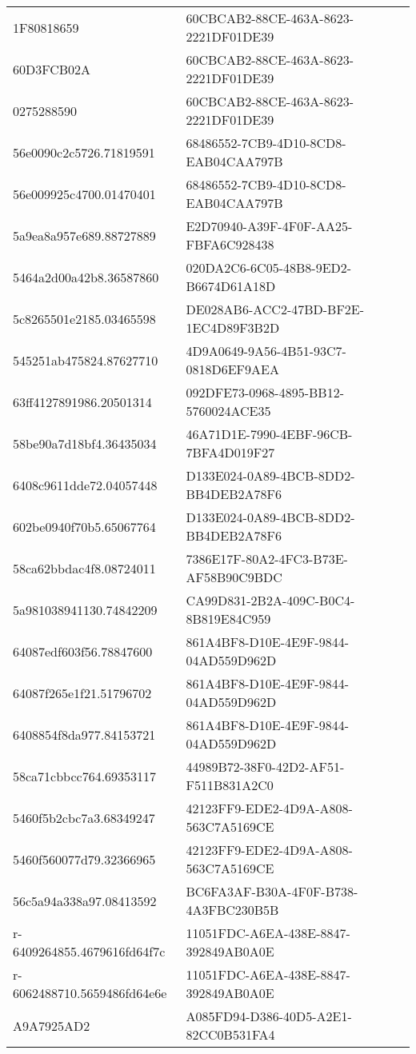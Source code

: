 \begin{tabular}{ll}
1F80818659 & 60CBCAB2-88CE-463A-8623-2221DF01DE39 \\
60D3FCB02A & 60CBCAB2-88CE-463A-8623-2221DF01DE39 \\
0275288590 & 60CBCAB2-88CE-463A-8623-2221DF01DE39 \\
56e0090c2c5726.71819591 & 68486552-7CB9-4D10-8CD8-EAB04CAA797B \\
56e009925c4700.01470401 & 68486552-7CB9-4D10-8CD8-EAB04CAA797B \\
5a9ea8a957e689.88727889 & E2D70940-A39F-4F0F-AA25-FBFA6C928438 \\
5464a2d00a42b8.36587860 & 020DA2C6-6C05-48B8-9ED2-B6674D61A18D \\
5c8265501e2185.03465598 & DE028AB6-ACC2-47BD-BF2E-1EC4D89F3B2D \\
545251ab475824.87627710 & 4D9A0649-9A56-4B51-93C7-0818D6EF9AEA \\
63ff4127891986.20501314 & 092DFE73-0968-4895-BB12-5760024ACE35 \\
58be90a7d18bf4.36435034 & 46A71D1E-7990-4EBF-96CB-7BFA4D019F27 \\
6408c9611dde72.04057448 & D133E024-0A89-4BCB-8DD2-BB4DEB2A78F6 \\
602be0940f70b5.65067764 & D133E024-0A89-4BCB-8DD2-BB4DEB2A78F6 \\
58ca62bbdac4f8.08724011 & 7386E17F-80A2-4FC3-B73E-AF58B90C9BDC \\
5a981038941130.74842209 & CA99D831-2B2A-409C-B0C4-8B819E84C959 \\
64087edf603f56.78847600 & 861A4BF8-D10E-4E9F-9844-04AD559D962D \\
64087f265e1f21.51796702 & 861A4BF8-D10E-4E9F-9844-04AD559D962D \\
6408854f8da977.84153721 & 861A4BF8-D10E-4E9F-9844-04AD559D962D \\
58ca71cbbcc764.69353117 & 44989B72-38F0-42D2-AF51-F511B831A2C0 \\
5460f5b2cbc7a3.68349247 & 42123FF9-EDE2-4D9A-A808-563C7A5169CE \\
5460f560077d79.32366965 & 42123FF9-EDE2-4D9A-A808-563C7A5169CE \\
56c5a94a338a97.08413592 & BC6FA3AF-B30A-4F0F-B738-4A3FBC230B5B \\
r-6409264855.4679616fd64f7c & 11051FDC-A6EA-438E-8847-392849AB0A0E \\
r-6062488710.5659486fd64e6e & 11051FDC-A6EA-438E-8847-392849AB0A0E \\
A9A7925AD2 & A085FD94-D386-40D5-A2E1-82CC0B531FA4 \\

\end{tabular}
